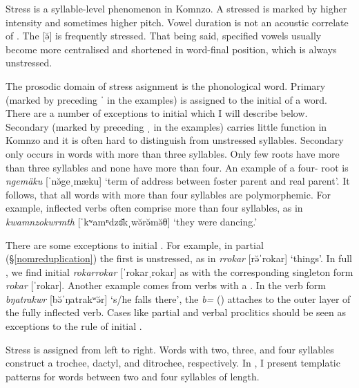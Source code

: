 Stress is a syllable-level phenomenon in Komnzo. A stressed  is marked by higher intensity and sometimes higher pitch. Vowel duration is not an acoustic correlate of . The  [ə̆] is frequently stressed. That being said, specified vowels usually become more centralised and shortened in word-final position, which is always unstressed.

The prosodic domain of stress asignment is the phonological word. Primary  (marked by preceding ˈ in the examples) is assigned to the initial  of a word. There are a number of exceptions to initial  which I will describe below. Secondary  (marked by preceding ˌ in the examples) carries little function in Komnzo and it is often hard to distinguish from unstressed syllables. Secondary  only occurs in words with more than three syllables. Only few roots have more than three syllables and none have more than four. An example of a four- root is \emph{ngemäku} [ˈnə̆{\ᵑ}geˌmæku] `term of address between foster parent and real parent'. It follows, that all words with more than four syllables are polymorphemic. For example, inflected verbs often comprise more than four syllables, as in \emph{kwamnzokwrmth} [ˈkʷamⁿdzɞ̆kˌwə̆rə̆mə̆θ] `they were dancing.'

There are some exceptions to initial . For example, in partial  ({\S}\ref{nomreduplication}) the first  is unstressed, as in \emph{rrokar} [rə̆ˈrokar] `things'. In full , we find initial  \emph{rokarrokar} [ˈrokarˌrokar] as with the corresponding singleton form \emph{rokar} [ˈrokar]. Another example comes from verbs with a . In the verb form \emph{bŋatrakwr} [bə̆ˈŋatrakʷə̆r] `s/he falls there', the  \emph{b=} (\Med{}) attaches to the outer layer of the fully inflected verb. Cases like partial  and verbal proclitics should be seen as exceptions to the rule of initial .

\newpage 
Stress is assigned from left to right. Words with two, three, and four syllables construct a trochee, dactyl, and ditrochee, respectively. In , I present templatic  patterns for words between two and four syllables of length.

